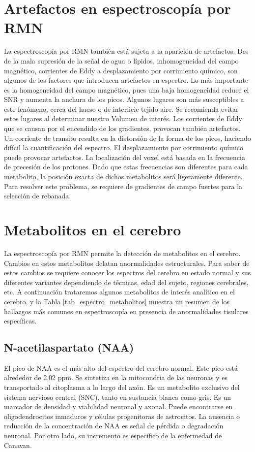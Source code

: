 \section{Artefactos en espectroscopía por RMN}
La espectroscopía por RMN también está sujeta a la aparición de artefactos. Des de la mala supresión de la señal de agua o lípidos, inhomogeneidad del campo magnético, corrientes de Eddy a desplazamiento por corrimiento químico, son algunos de los factores que introducen artefactos en espectro.
Lo más importante es la homogeneidad del campo magnético, pues una baja homogeneidad reduce el SNR y aumenta la anchura de los picos. Algunos lugares son más susceptibles a este fenómeno, cerca del hueso o de interficie tejido-aire. Se recomienda evitar estos lugares al determinar nuestro Volumen de interés.
Los corrientes de Eddy que se causan por el encendido de los gradientes, provocan también artefactos. Un corriente de transito resulta en la distorsión de la forma de los picos, haciendo difícil la cuantificación del espectro.
El desplazamiento por corrimiento químico puede provocar artefactos. La localización del voxel está basada en la frecuencia de precesión de los protones. Dado que estas frecuencias son diferentes para cada metabolito, la posición exacta de dichos metabolitos será ligeramente diferente. Para resolver este problema, se requiere de gradientes de campo fuertes para la selección de rebanada.




\section{Metabolitos en el cerebro}
La espectroscopía por RMN permite la detección de metabolitos en el cerebro. Cambios en estos metabolitos delatan anormalidades estructurales. Para saber de estos cambios se requiere conocer los espectros del cerebro en estado normal y sus diferentes variantes dependiendo de técnicas, edad del sujeto, regiones cerebrales, etc.
A continuación trataremos algunos metabolitos de interés analítico en el cerebro, y la Tabla \ref{tab_espectro_metabolitos} muestra un resumen de los hallazgos más comunes en espectroscopía en presencia de anormalidades tisulares específicas.

\subsection{N-acetilaspartato (NAA)}
El pico de NAA es el más alto del espectro del cerebro normal. Este pico está alrededor de  2,02 ppm. Se sintetiza en la mitocondria de las neuronas y es transportado al citoplasma a lo largo del axón. Es un metabolito exclusivo del sistema nervioso central (SNC), tanto en sustancia blanca como gris. Es un marcador de densidad y viabilidad neuronal y axonal. Puede encontrarse en oligodendrocitos inmaduros y células progenitoras de astrocitos.
La ausencia o reducción de la concentración de NAA es señal de pérdida o degradación neuronal. Por otro lado, su incremento es específico de la enfermedad de Canavan.

